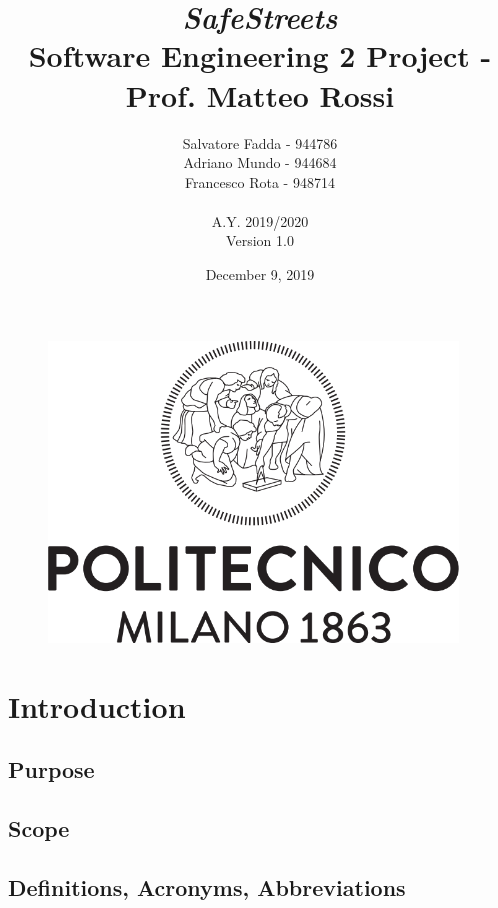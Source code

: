\documentclass{article}
\begin{document}
\begin{figure}
\centering
	\includegraphics[height=8cm]{Images/polimi_logo}
\end{figure}
	
\title {{\Huge \it SafeStreets} \\ \Large Software Engineering 2 Project - Prof. Matteo Rossi}
\author{Salvatore Fadda - 944786\\Adriano Mundo - 944684 \\ Francesco Rota - 948714
		\\ \\ A.Y. 2019/2020 \\ Version 1.0}
\date{December 9, 2019}	

\maketitle
\newpage

\tableofcontents
\newpage

\section{Introduction}
	\subsection{Purpose}
		
	\subsection{Scope}
		
	\subsection{Definitions, Acronyms, Abbreviations}
	
\end{document}
